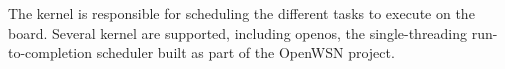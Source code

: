 The kernel is responsible for scheduling the different tasks to execute on the board. Several kernel are supported, including {\ttfamily openos}, the single-\/threading run-\/to-\/completion scheduler built as part of the Open\+W\+SN project. 